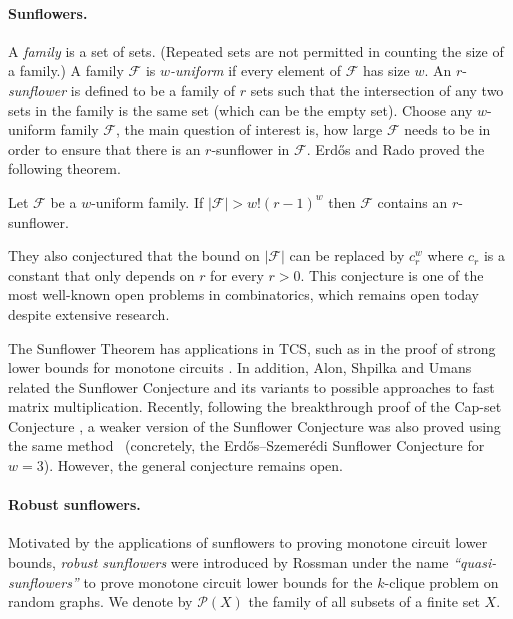 \documentclass{toc}
\newcommand{\calF}{\mathcal{F}} %
\begin{document}
\paragraph{Sunflowers.}
%
A \emph{family} is a set of sets.  (Repeated sets are not permitted
in counting the size of a family.)  A family $\calF$
is \emph{$w$-uniform} if every element of $\calF$
has size $w$.  %
An $r$-\emph{sunflower} is defined to be a family of $r$ sets
%
such that the intersection of any two sets
in the family  %
is the same
set  %
%
(which can be the empty set). Choose any $w$-uniform family $\calF$,
%
%
the main question of interest is, how large
$\calF$ needs to be in order to ensure that there is
%
an $r$-sunflower  %
in $\calF$. Erd\H{o}s and Rado proved the following theorem.

\begin{theorem}  \label{thm:erdosrado}
Let $\calF$ be %
%
%
a $w$-uniform family.  %
If $|\calF| > w!(r-1)^w$  then $\calF$ contains an $r$-sunflower.
\end{theorem}

They also conjectured that the bound on $|\calF|$ can be replaced by
$c_r^w$ where $c_r$ is a constant that only depends on $r$ for every
$r>0$. This conjecture is one of the most well-known open problems in
combinatorics, which remains open today despite extensive research.

The Sunflower Theorem has applications in %
TCS,   %
such as
%
in the proof of %
strong lower bounds for monotone circuits \cite{Razborov1985}. In
addition, Alon,  Shpilka and Umans \cite{AlonSU2012} related the
Sunflower Conjecture and its variants to possible approaches to
fast matrix multiplication. Recently, following the breakthrough proof of the
Cap-set Conjecture \cite{CrootLP2017,EllenbergG2017}, a weaker version of the
Sunflower Conjecture was also proved using the same method~\cite{naslund2017upper} (concretely, the Erd\H{o}s--Szemer\'{e}di Sunflower Conjecture for $w=3$). However, the general conjecture remains open.

\paragraph{Robust sunflowers.} Motivated by the applications of sunflowers
%
to   %
proving monotone circuit lower bounds,
\emph{robust sunflowers}  %
were introduced by Rossman \cite{rossman2010monotone}
under the name \emph{``quasi-sunflowers''} %
to prove monotone circuit lower bounds for the $k$-clique problem
on random graphs. We denote by
$\mathcal{P}(X)$ the family of all subsets of a finite set $X$.
\end{document}

